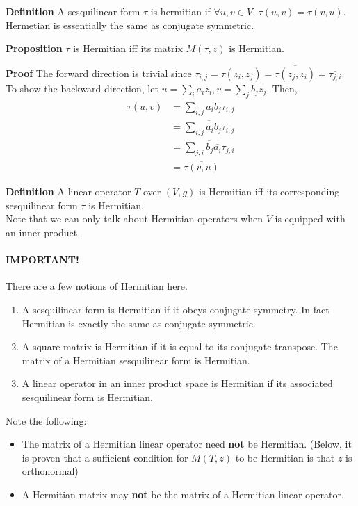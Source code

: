 \documentclass{article}
\begin{document}
\textbf{Definition} A sesquilinear form $\tau$ is hermitian if $\forall u,v\in V,\, \tau(u,v)=\overline{\tau(v,u)}$.\\
Hermetian is essentially the same as conjugate symmetric.

\textbf{Proposition} $\tau$ is Hermitian iff its matrix $M(\tau,z)$ is Hermitian.

\textbf{Proof} The forward direction is trivial since $\tau_{i,j} = \tau(z_i,z_j)=\overline{\tau(z_j,z_i)}=\overline{\tau_{j,i}}$. To show the backward direction, let $u=\sum_ia_iz_i,v=\sum_jb_jz_j$. Then,
\begin{align*}
	\tau(u,v)&=\sum_{i,j}a_i\overline{b_j}\tau_{i,j}\\
	&=\overline{\sum_{i,j}\overline{a_i}b_j\overline{\tau_{i,j}}}\\
	&=\overline{\sum_{j,i}b_j\overline{a_i}\tau_{j,i}}\\
	&=\overline{\tau(v,u)}
\end{align*}

\textbf{Definition} A linear operator $T$ over $(V,g)$ is Hermitian iff its corresponding sesquilinear form $\tau$ is Hermitian.\\
Note that we can only talk about Hermitian operators when $V$ is equipped with an inner product.

\paragraph{IMPORTANT!} There are a few notions of Hermitian here.
\begin{enumerate}
	\item A sesquilinear form is Hermitian if it obeys conjugate symmetry. In fact Hermitian is exactly the same as conjugate symmetric.
	\item A square matrix is Hermitian if it is equal to its conjugate transpose. The matrix of a Hermitian sesquilinear form is Hermitian.
	\item A linear operator in an inner product space is Hermitian if its associated sesquilinear form is Hermitian.
\end{enumerate} 
Note the following:
\begin{itemize}
	\item The matrix of a Hermitian linear operator need \textbf{not} be Hermitian. (Below, it is proven that a sufficient condition for $M(T,z)$ to be Hermitian is that $z$ is orthonormal)
	\item A Hermitian matrix may \textbf{not} be the matrix of a Hermitian linear operator.
\end{itemize}
\end{document}
